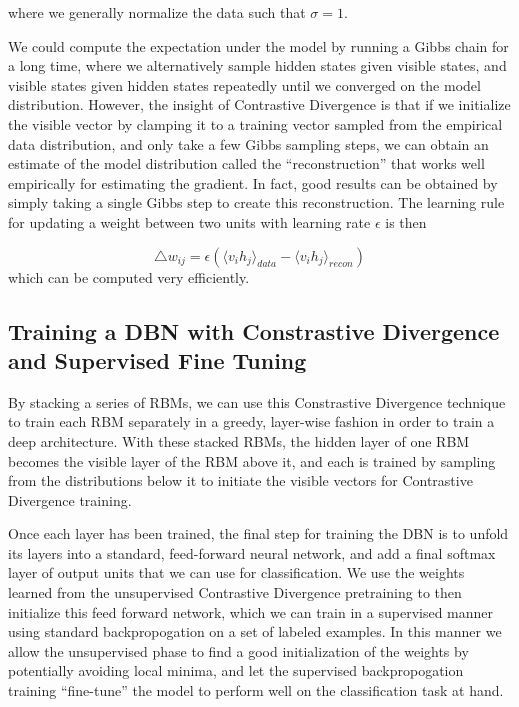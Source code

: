 \documentclass{article}
\begin{document}
where we generally normalize the data such that $\sigma = 1$.

We could compute the expectation under the model by running a Gibbs chain for a
long time, where we alternatively sample hidden states given visible states,
and visible states given hidden states repeatedly until we converged on the
model distribution. However, the insight of Contrastive Divergence is that if
we initialize the visible vector by clamping it to a training vector sampled
from the empirical data distribution, and only take a few Gibbs sampling steps,
we can obtain an estimate of the model distribution called the
``reconstruction'' that works well empirically for estimating the gradient. In
fact, good results can be obtained by simply taking a single Gibbs step to
create this reconstruction. The learning rule for updating a weight between two
units with learning rate $\epsilon$ is then

\[
  \triangle w_{ij} = \epsilon( 
  \langle v_i h_j \rangle_{data} - \langle v_i h_j \rangle_{recon}
  )
\]
which can be computed very efficiently.

\subsection{Training a DBN with Constrastive Divergence and Supervised Fine Tuning}

By stacking a series of RBMs, we can use this Constrastive Divergence technique
to train each RBM separately in a greedy, layer-wise fashion in order to train
a deep architecture. With these stacked RBMs, the hidden layer of one RBM
becomes the visible layer of the RBM above it, and each is trained by sampling
from the distributions below it to initiate the visible vectors for
Contrastive Divergence training.

Once each layer has been trained, the final step for training the DBN is to
unfold its layers into a standard, feed-forward neural network, and add a final
softmax layer of output units that we can use for classification. We use the
weights learned from the unsupervised Contrastive Divergence pretraining to
then initialize this feed forward network, which we can train in a supervised
manner using standard backpropogation on a set of labeled examples. In this
manner we allow the unsupervised phase to find a good initialization of the
weights by potentially avoiding local minima, and let the supervised
backpropogation training ``fine-tune'' the model to perform well on the
classification task at hand.
\end{document}
